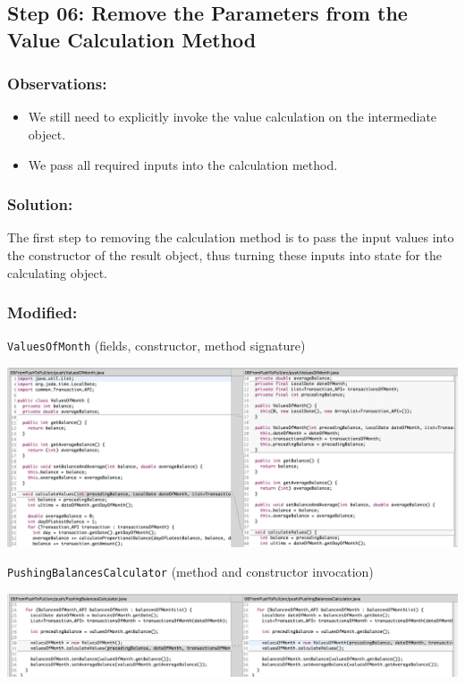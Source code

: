 \documentclass[a4paper,fleqn,titlepage,11pt]{article}
\begin{document}
\subsection*{Step 06: Remove the Parameters from the Value Calculation Method}

\subsubsection*{Observations:}
\begin{itemize}
\item We still need to explicitly invoke the value calculation on the intermediate object. 
\item We pass all required inputs into the calculation method.
\end{itemize}

\subsubsection*{Solution:}

The first step to removing the calculation method is to pass the input values into the constructor of the result object, thus turning these inputs into state for the calculating object.

\subsubsection*{Modified:}

\texttt{ValuesOfMonth} (fields, constructor, method signature)

\includegraphics[width=1\textwidth]{CompareViews/05-06-2.png}

\texttt{PushingBalancesCalculator} (method and constructor invocation)

\includegraphics[width=1\textwidth]{CompareViews/05-06-1.png}
\end{document}
